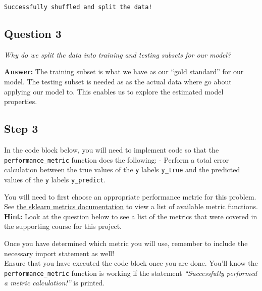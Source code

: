 \documentclass{article}
\begin{document}
    \begin{Verbatim}[commandchars=\\\{\}]
Successfully shuffled and split the data!
    \end{Verbatim}

    \subsection{Question 3}\label{question-3}

\emph{Why do we split the data into training and testing subsets for our
model?}

    \textbf{Answer: } The training subset is what we have as our ``gold
standard'' for our model. The testing subset is needed as as the actual
data where go about applying our model to. This enables us to explore
the estimated model properties.

    \subsection{Step 3}\label{step-3}

In the code block below, you will need to implement code so that the
\texttt{performance\_metric} function does the following: - Perform a
total error calculation between the true values of the \texttt{y} labels
\texttt{y\_true} and the predicted values of the \texttt{y} labels
\texttt{y\_predict}.

You will need to first choose an appropriate performance metric for this
problem. See
\href{http://scikit-learn.org/stable/modules/classes.html\#sklearn-metrics-metrics}{the
sklearn metrics documentation} to view a list of available metric
functions. \textbf{Hint: } Look at the question below to see a list of
the metrics that were covered in the supporting course for this project.

Once you have determined which metric you will use, remember to include
the necessary import statement as well!\\
Ensure that you have executed the code block once you are done. You'll
know the \texttt{performance\_metric} function is working if the
statement \emph{``Successfully performed a metric calculation!''} is
printed.
\end{document}
